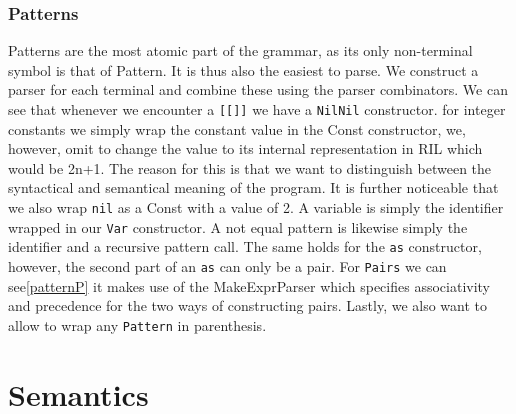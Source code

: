\documentclass[a4paper]{article}
\begin{document}
\subsubsection{Patterns}
\label{sec:org88a8fac}
Patterns are the most atomic part of the grammar, as its only non-terminal symbol is that of Pattern. It is thus also the easiest to parse. We construct a parser for each terminal and combine these using the parser combinators.
We can see that whenever we encounter a \texttt{[[]]} we have a \texttt{NilNil} constructor. for integer constants we simply wrap the constant value in the Const constructor, we, however, omit to change the value to its internal representation in RIL which would be 2n+1. The reason for this is that we want to distinguish between the syntactical and semantical meaning of the program. It is further noticeable that we also wrap \texttt{nil} as a Const with a value of 2.
A variable is simply the identifier wrapped in our \texttt{Var} constructor.
A not equal pattern is likewise simply the identifier and a recursive pattern call. The same holds for the \texttt{as} constructor, however, the second part of an \texttt{as} can only be a pair. For \texttt{Pairs} we can see\ref{patternP} it makes use of the MakeExprParser which specifies associativity and precedence for the two ways of constructing pairs.
Lastly, we also want to allow to wrap any \texttt{Pattern} in parenthesis.
\section{Semantics}
\label{sec:org8b98fcb}
\end{document}
